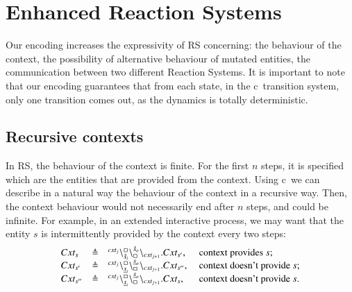
\section{Enhanced  Reaction Systems}
\label{sec:discussion}

Our encoding increases the expressivity of  RS  concerning:
the behaviour of the context, the possibility of alternative behaviour of
mutated entities, the communication between two different Reaction Systems.
It is important to note that our encoding guarantees that from each state, 
in the  c\CNA \ transition system, only one transition comes out, 
as the dynamics is totally deterministic.

\subsection{Recursive contexts}
In RS, the behaviour of the context is finite. For the first $n$ steps, it is specified 
 which are the entities that are provided from the context. 
Using c\CNA\ we can describe in a natural way the behaviour of the context in a recursive way. 
Then, the context behaviour would not necessarily end after $n$ steps,
and  could be infinite.
For example, in an extended interactive process, we may want that the entity $s$ is 
intermittently provided by the context every two steps: 
\[
\begin{array}{lcll}
Cxt_s & \triangleq &  {}^{cxt_j}\backslash_{\hat{s}_i}^{\scriptstyle {\square}}\backslash_{\scriptstyle {\square}}^{\hat{s}_o}\backslash_{cxt_{j+1}}.Cxt_{s'}, &\mbox{ context provides $s$;} \\
Cxt_{s'} & \triangleq & {}^{cxt_j}\backslash_{\underline{s}_i}^{\scriptstyle {\square}}\backslash_{\scriptstyle {\square}}^{\underline{s}_o}\backslash_{cxt_{j+1}}.Cxt_{s''},& \mbox{ context doesn't provide $s$;} \\
Cxt_{s''} & \triangleq & {}^{cxt_j}\backslash_{\underline{s}_i}^{\scriptstyle {\square}}\backslash_{\scriptstyle {\square}}^{\underline{s}_o}\backslash_{cxt_{j+1}}.Cxt_{s}, & \mbox{ context doesn't provide $s$.} \\
\end{array}
\]

